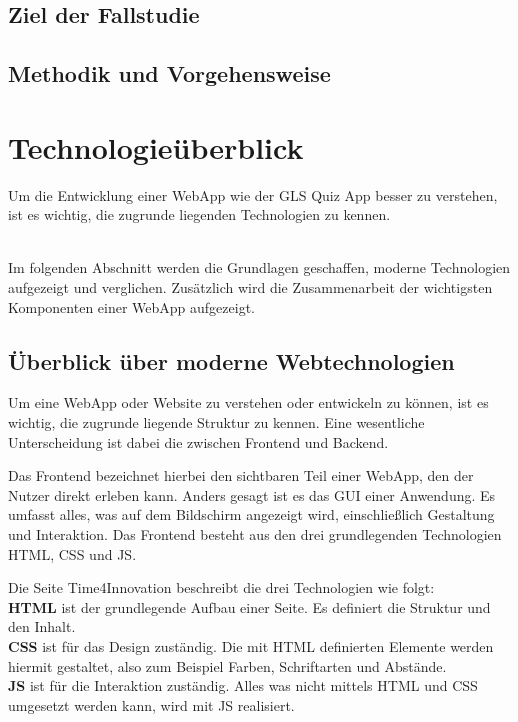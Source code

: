 \documentclass[biblatex]{lni}
\begin{document}
\subsection{Ziel der Fallstudie}

\subsection{Methodik und Vorgehensweise}

\section{Technologieüberblick}
Um die Entwicklung einer WebApp wie der GLS Quiz App besser zu verstehen,
ist es wichtig, die zugrunde liegenden Technologien zu kennen.

\\

Im folgenden Abschnitt werden die Grundlagen geschaffen,
moderne Technologien aufgezeigt und verglichen.
Zusätzlich wird die Zusammenarbeit der wichtigsten Komponenten einer WebApp aufgezeigt.

\subsection{Überblick über moderne Webtechnologien}
\label{sec:moderne-webtechnologien}

Um eine WebApp oder Website zu verstehen oder entwickeln zu können, ist es wichtig, die zugrunde liegende Struktur zu kennen.
Eine wesentliche Unterscheidung ist dabei die zwischen Frontend und Backend.

Das Frontend bezeichnet hierbei den sichtbaren Teil einer WebApp, den der Nutzer direkt erleben kann. \cite{CMSRev}
Anders gesagt ist es das \ac{GUI} einer Anwendung.
Es umfasst alles, was auf dem Bildschirm angezeigt wird, einschließlich Gestaltung und Interaktion.
Das Frontend besteht aus den drei grundlegenden Technologien \ac{HTML}, \ac{CSS} und \ac{JS}.

Die Seite Time4Innovation \cite{T4I} beschreibt die drei Technologien wie folgt: \\
\textbf{\ac{HTML}} ist der grundlegende Aufbau einer Seite.
Es definiert die Struktur und den Inhalt. \\
\textbf{\ac{CSS}} ist für das Design zuständig.
Die mit \ac{HTML} definierten Elemente werden hiermit gestaltet, also zum Beispiel Farben, Schriftarten und Abstände. \\
\textbf{\ac{JS}} ist für die Interaktion zuständig.
Alles was nicht mittels \ac{HTML} und \ac{CSS} umgesetzt werden kann, wird mit \ac{JS} realisiert.
\end{document}
